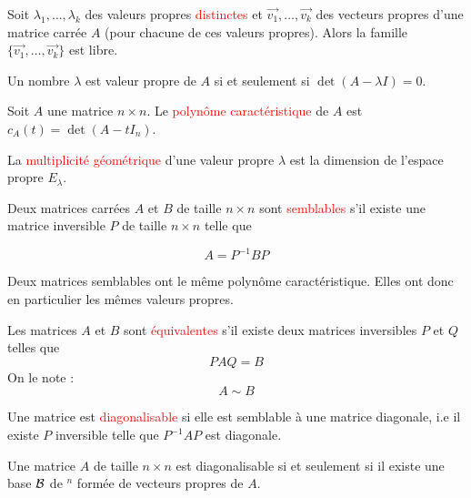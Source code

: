     \begin{theoreme}
    Soit $\lambda_1, \dots, \lambda_k$ des valeurs propres \textcolor{red}{distinctes} et $\vec{v_1}, \dots, \vec{v_k}$ des vecteurs propres d'une matrice carrée $A$ (pour chacune de ces valeurs propres). Alors la famille $\{\vec{v_1}, \dots, \vec{v_k}\}$ est libre.
    \end{theoreme}
    \begin{theoreme}
        Un nombre $\lambda$ est valeur propre de $A$ si et seulement si $\det (A - \lambda I) = 0$.
    \end{theoreme}
    \begin{definition}
        Soit $A$ une matrice $n \times n$. Le \textcolor{red}{polynôme caractéristique} de $A$ est $c_A(t) = \det(A - tI_n)$.
    \end{definition}
        \begin{definition}
            La \textcolor{red}{multiplicité géométrique} d'une valeur propre $\lambda$ est la dimension de l'espace propre $E_\lambda$.
        \end{definition}
    \begin{definition}
        Deux matrices carrées $A$ et $B$ de taille $n\times n$ sont \textcolor{red}{semblables} s'il existe une matrice inversible $P$ de taille $n \times n$ telle que 
        \begin{formule}
            \[A = P^{-1}BP\]
        \end{formule}
    \end{definition}
    \begin{theoreme}
        Deux matrices semblables ont le même polynôme caractéristique. Elles ont donc en particulier les mêmes valeurs propres.
    \end{theoreme}
    \begin{definition}
        Les matrices $A$ et $B$ sont \textcolor{red}{équivalentes} s'il existe deux matrices inversibles $P$ et $Q$ telles que 
        \[PAQ = B\]
        On le note :
        \[A \sim B\]
    \end{definition}
    \begin{definition}
        Une matrice est \textcolor{red}{diagonalisable} si elle est semblable à une matrice diagonale, i.e il existe $P$ inversible telle que $P^{-1}AP$ est diagonale.
    \end{definition}
    \begin{theoreme}
        Une matrice $A$ de taille $n\times n$ est diagonalisable si et seulement si il existe une base $\mathcal{B}$ de \R$^n$ formée de vecteurs propres de $A$.
    \end{theoreme}
